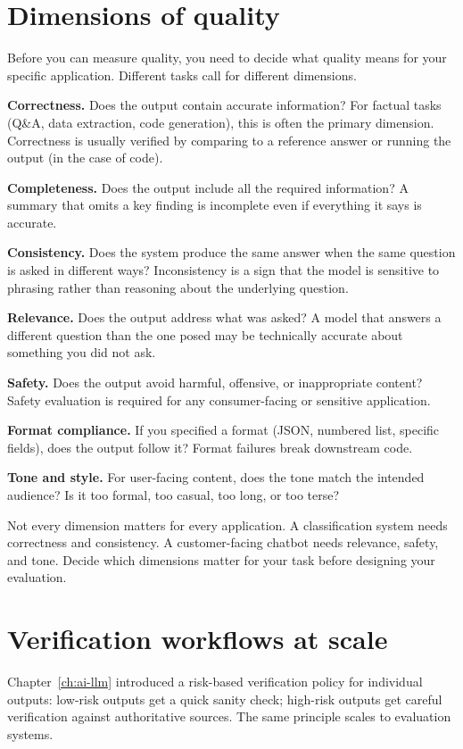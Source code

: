 \section{Dimensions of quality}

Before you can measure quality, you need to decide what quality means for your specific application. Different tasks call for different dimensions.

\textbf{Correctness.} Does the output contain accurate information? For factual tasks (Q\&A, data extraction, code generation), this is often the primary dimension. Correctness is usually verified by comparing to a reference answer or running the output (in the case of code).

\textbf{Completeness.} Does the output include all the required information? A summary that omits a key finding is incomplete even if everything it says is accurate.

\textbf{Consistency.} Does the system produce the same answer when the same question is asked in different ways? Inconsistency is a sign that the model is sensitive to phrasing rather than reasoning about the underlying question.

\textbf{Relevance.} Does the output address what was asked? A model that answers a different question than the one posed may be technically accurate about something you did not ask.

\textbf{Safety.} Does the output avoid harmful, offensive, or inappropriate content? Safety evaluation is required for any consumer-facing or sensitive application.

\textbf{Format compliance.} If you specified a format (JSON, numbered list, specific fields), does the output follow it? Format failures break downstream code.

\textbf{Tone and style.} For user-facing content, does the tone match the intended audience? Is it too formal, too casual, too long, or too terse?

Not every dimension matters for every application. A classification system needs correctness and consistency. A customer-facing chatbot needs relevance, safety, and tone. Decide which dimensions matter for your task before designing your evaluation.

\section{Verification workflows at scale}

Chapter~\ref{ch:ai-llm} introduced a risk-based verification policy for individual outputs: low-risk outputs get a quick sanity check; high-risk outputs get careful verification against authoritative sources. The same principle scales to evaluation systems.

